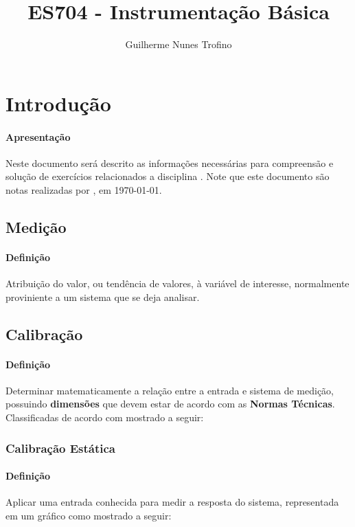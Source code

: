 \documentclass{article}
\title{ES704 - Instrumentação Básica}
\author{Guilherme Nunes Trofino}
\begin{document}
    \maketitle
\newpage

    \tableofcontents
\newpage

\section{Introdução}
    \paragraph{Apresentação}Neste documento será descrito as informações necessárias para compreensão e solução de exercícios relacionados a disciplina \thetitle. Note que este documento são notas realizadas por \theauthor, em \today.

    \subsection{Medição}
        \paragraph{Definição}Atribuição do valor, ou tendência de valores, à variável de interesse, normalmente proviniente a um sistema que se deja analisar.

    \subsection{Calibração}
        \paragraph{Definição}Determinar matematicamente a relação entre a entrada e sistema de medição, possuindo \textbf{dimensões} que devem estar de acordo com as \textbf{Normas Técnicas}. Classificadas de acordo com mostrado a seguir:

        \subsubsection{Calibração Estática}
            \paragraph{Definição}Aplicar uma entrada conhecida para medir a resposta do sistema, representada em um gráfico como mostrado a seguir:
\end{document}
